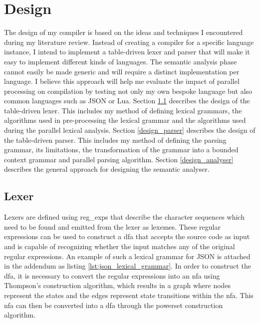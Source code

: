 \chapter{Design} \label{design}

The design of my compiler is based on the ideas and techniques I encountered
during my literature review. Instead of creating a compiler for a specific
language instance, I intend to implement a table-driven lexer and parser that
will make it easy to implement different kinds of languages. The semantic
analysis phase cannot easily be made generic and will require a distinct
implementation per language. I believe this approach will help me evaluate the
impact of parallel processing on compilation by testing not only my own bespoke
language but also common languages such as JSON or Lua.
\newline\newline
Section \ref{design_lexer} describes the design of the table-driven lexer.
This includes my method of defining lexical grammars, the algorithms used in
pre-processing the lexical grammar and the algorithms used during the parallel
lexical analysis.
\newline\newline
Section \ref{design_parser} describes the design of the table-driven parser.
This includes my method of defining the parsing grammar, its limitations,
the transformation of the grammar into a bounded context grammar and parallel
parsing algorithm.
\newline\newline
Section \ref{design_analyser} describes the general approach for designing the
semantic analyser.

\section{Lexer} \label{design_lexer}

Lexers are defined using \glspl{reg_exp} that describe the character sequences
which need to be found and emitted from the lexer as lexemes. These regular
expressions can be used to construct a \gls{dfa} that accepts the source code
as input and is capable of recognizing whether the input matches any of the
original regular expressions. An example of such a lexical grammar for JSON is
attached in the addendum as listing \ref{lst:json_lexical_grammar}. In order
to construct the \gls{dfa}, it is necessary to convert the regular expressions
into an \gls{nfa} using Thompson's construction algorithm, which results in a
graph where nodes represent the states and the edges represent state transitions
within the \gls{nfa}. This \gls{nfa} can then be converted into a \gls{dfa}
through the powerset construction algorithm.

